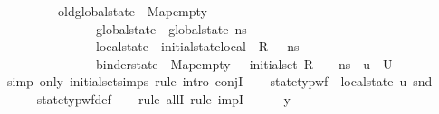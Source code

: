 \begin{isabellebody}
\ \ \ \ \ \ \ \ \ {\isachardoublequoteopen}{\isasymlparr}old{\isacharunderscore}{\kern0pt}global{\isacharunderscore}{\kern0pt}state\ {\isacharequal}{\kern0pt}\ Map{\isachardot}{\kern0pt}empty{\isacharcomma}{\kern0pt}\ \isanewline
\ \ \ \ \ \ \ \ \ \ \ \ \ \ \ global{\isacharunderscore}{\kern0pt}state\ {\isacharequal}{\kern0pt}\ global{\isacharunderscore}{\kern0pt}state\ ns{\isacharcomma}{\kern0pt}\ \isanewline
\ \ \ \ \ \ \ \ \ \ \ \ \ \ \ local{\isacharunderscore}{\kern0pt}state\ {\isacharequal}{\kern0pt}\ {\isacharparenleft}{\kern0pt}initial{\isacharunderscore}{\kern0pt}state{\isacharunderscore}{\kern0pt}local\ {\isasymOmega}\ R\ {\isasymLambda}\ {\isasymLambda}{\isacharprime}{\kern0pt}\ ns{\isacharparenright}{\kern0pt}{\isacharcomma}{\kern0pt}\ \isanewline
\ \ \ \ \ \ \ \ \ \ \ \ \ \ \ binder{\isacharunderscore}{\kern0pt}state\ {\isacharequal}{\kern0pt}\ Map{\isachardot}{\kern0pt}empty\ {\isasymrparr}\ {\isasymin}\ initial{\isacharunderscore}{\kern0pt}set\ R\ {\isasymLambda}\ {\isasymLambda}{\isacharprime}{\kern0pt}\ {\isasymOmega}\ ns{\isachardoublequoteclose}\ {\isacharparenleft}{\kern0pt}\ {\isachardoublequoteopen}{\isacharquery}{\kern0pt}u\ {\isasymin}\ {\isacharquery}{\kern0pt}U{\isachardoublequoteclose}{\isacharparenright}{\kern0pt}\isanewline
%
\isadelimproof
%
\endisadelimproof
%
\isatagproof
{}\isamarkupfalse%
\ {\isacharparenleft}{\kern0pt}simp\ only{\isacharcolon}{\kern0pt}\ initial{\isacharunderscore}{\kern0pt}set{\isachardot}{\kern0pt}simps{\isacharcomma}{\kern0pt}\ rule{\isacharcomma}{\kern0pt}\ intro\ conjI{\isacharparenright}{\kern0pt}\isanewline
\ \ \isamarkupfalse%
\ {\isachardoublequoteopen}state{\isacharunderscore}{\kern0pt}typ{\isacharunderscore}{\kern0pt}wf\ {\isasymOmega}\ {\isacharparenleft}{\kern0pt}local{\isacharunderscore}{\kern0pt}state\ {\isacharquery}{\kern0pt}u{\isacharparenright}{\kern0pt}\ {\isacharparenleft}{\kern0pt}snd\ {\isasymLambda}{\isacharprime}{\kern0pt}{\isacharparenright}{\kern0pt}{\isachardoublequoteclose}\isanewline
\ \ \ \ \isamarkupfalse%
\ state{\isacharunderscore}{\kern0pt}typ{\isacharunderscore}{\kern0pt}wf{\isacharunderscore}{\kern0pt}def\isanewline
\ \ \isamarkupfalse%
\ {\isacharparenleft}{\kern0pt}{\isacharparenleft}{\kern0pt}rule\ allI{\isacharparenright}{\kern0pt}{\isacharplus}{\kern0pt}{\isacharcomma}{\kern0pt}\ rule\ impI{\isacharparenright}{\kern0pt}\isanewline
\ \ \ \ \isamarkupfalse%
\ y\ {\isasymtau}\isanewline
\ \ \ \ \isamarkupfalse%

\end{isabellebody}
